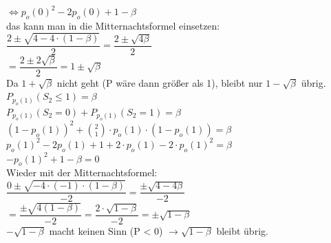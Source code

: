 \documentclass{article}
\begin{document}
				$\Leftrightarrow p_o(0)^2 - 2p_o(0) + 1 - \beta$\\[1.1em]
				
				das kann man in die Mitternachtsformel einsetzen:\\[1.1em]
				
				$\dfrac{2 \pm \sqrt{4 - 4 \cdot (1 - \beta)}}{2} = \dfrac{2 \pm \sqrt{4\beta}}{2}$\\[1.1em]
				
				$= \dfrac{2 \pm 2\sqrt{\beta}}{2} = 1 \pm \sqrt{\beta}$\\ 
				Da $1 + \sqrt{\beta}$ nicht geht (P wäre dann größer als 1), bleibt nur $1 - \sqrt{\beta}$ übrig.\\[2em]
				
				
				$P_{p_o(1)}(S_2 \leq 1) = \beta$\\[1.1em]
				
				$P_{p_o(1)}(S_2 = 0) + P_{p_o(1)}(S_2 = 1) = \beta$\\[1.1em]
				
				$(1 - p_o(1))^2 + \binom{2}{1} \cdot p_o(1) \cdot (1 - p_o(1)) = \beta$\\[1.1em]
				
				$p_o(1)^2 - 2p_o(1) + 1 + 2\cdot p_o(1) - 2\cdot p_o(1)^2 = \beta$\\[1.1em]
				
				$-p_o(1)^2 + 1 - \beta = 0$\\[1.1em]
				
				Wieder mit der Mitternachtsformel:\\[1.1em]
				
				$\dfrac{0 \pm\sqrt{-4 \cdot (-1) \cdot (1-\beta)}}{-2} =\dfrac{\pm \sqrt{4-4\beta}}{-2}$\\[1.1em]
				
				$= \dfrac{\pm \sqrt{4(1-\beta)}}{-2} = \dfrac{2 \cdot \sqrt{1 - \beta}}{-2} = \pm \sqrt{1-\beta}$\\
				$-\sqrt{1-\beta}$ macht keinen Sinn (P < 0) $\rightarrow \sqrt{1-\beta}$ bleibt übrig.\\[2em]
				
\end{document}
